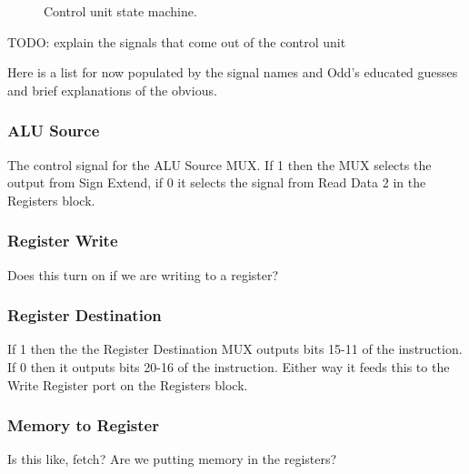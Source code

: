 \begin{figure}[h]
    \begin{center}
            \caption{Control unit state machine.}
            \label{figure:control-unit-state-machine}
    \end{center}
\end{figure}

TODO: explain the signals that come out of the control unit

Here is a list for now populated by the signal names and Odd's educated guesses and brief explanations of the obvious.

\subsubsection{ALU Source}
The control signal for the ALU Source MUX. If 1 then the MUX selects the output from Sign Extend, if 0 it selects the signal from Read Data 2 in the Registers block.

\subsubsection{Register Write}
Does this turn on if we are writing to a register?

\subsubsection{Register Destination}
If 1 then the the Register Destination MUX outputs bits 15-11 of the instruction. If 0 then it outputs bits 20-16 of the instruction. Either way it feeds this to the Write Register port on the Registers block.

\subsubsection{Memory to Register}
Is this like, fetch? Are we putting memory in the registers?

